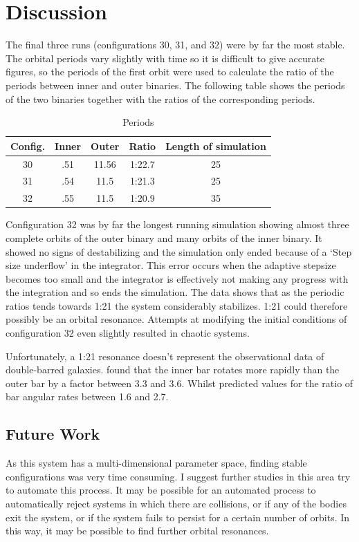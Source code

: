 \documentclass[a4paper,12pt]{article}
\begin{document}
\newpage
\section{Discussion}
The final three runs (configurations 30, 31, and 32) were by far the most stable. The orbital periods vary slightly with time so it is difficult to give accurate figures, so the 
periods of the first orbit were used to calculate the ratio of the periods between inner and outer binaries. The following table shows the periods of the two binaries together with the ratios of the corresponding periods.
\begin{table}[ht!]
  \centering
  \caption{Periods}
  \label{tab:periods}
  \begin{tabular}{ccccc}
   Config. & Inner & Outer & Ratio & Length of simulation\\
    \hline
   30 & .51 & 11.56 & 1:22.7 & 25\\
   31 & .54 & 11.5 & 1:21.3 & 25\\
   32 & .55 & 11.5 & 1:20.9 & 35\\
  \end{tabular}
\end{table}

Configuration 32 was by far the longest running simulation showing almost three complete orbits of the outer binary and many orbits of the inner binary. It showed no signs of destabilizing and the 
simulation only ended because of a `Step size underflow' in the integrator. This error occurs when the adaptive stepsize becomes too small and the integrator is effectively not making any
progress with the integration and so ends the simulation. The data shows that as the periodic ratios tends towards 1:21 the system considerably stabilizes. 1:21 could therefore possibly be an orbital resonance. 
Attempts at modifying the initial conditions of configuration 32 even slightly resulted in chaotic systems.

Unfortunately, a 1:21 resonance doesn't represent the observational data of double-barred galaxies. \cite{font} found that the inner bar rotates more rapidly than the outer bar by a factor between 3.3 and 3.6.
Whilst \cite{macie4} predicted values for the ratio of bar angular rates between 1.6 and 2.7.

\subsection{Future Work}
As this system has a multi-dimensional parameter space, finding stable configurations was very time consuming. I suggest further studies in this area try to automate this process.
It may be possible for an automated process to automatically reject systems in which there are collisions, or if any of the bodies exit the system, or if the system fails 
to persist for a certain number of orbits. In this way, it may be possible to find further orbital resonances.
\end{document}
